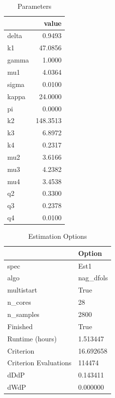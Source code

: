 \documentclass[letter, 10pt]{article}
\begin{document}
\begin{table}[h]
\centering
\caption{Parameters}
\begin{tabular}{lr}
\toprule
 & value \\
\midrule
delta & 0.9493 \\
k1 & 47.0856 \\
gamma & 1.0000 \\
mu1 & 4.0364 \\
sigma & 0.0100 \\
kappa & 24.0000 \\
pi & 0.0000 \\
k2 & 148.3513 \\
k3 & 6.8972 \\
k4 & 0.2317 \\
mu2 & 3.6166 \\
mu3 & 4.2382 \\
mu4 & 3.4538 \\
q2 & 0.3300 \\
q3 & 0.2378 \\
q4 & 0.0100 \\
\bottomrule
\end{tabular}
\end{table}

\begin{table}[h]
\centering
\caption{Estimation Options}
\begin{tabular}{ll}
\toprule
 & Option \\
\midrule
spec & Est1 \\
algo & nag\_dfols \\
multistart & True \\
n\_cores & 28 \\
n\_samples & 2800 \\
Finished & True \\
Runtime (hours) & 1.513447 \\
Criterion & 16.692658 \\
Criterion Evaluations & 114474 \\
dDdP & 0.143411 \\
dWdP & 0.000000 \\
\bottomrule
\end{tabular}
\end{table}
\end{document}
